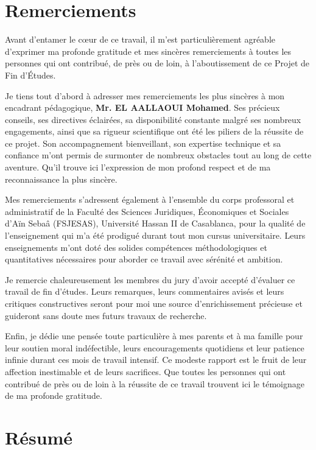 \chapter*{Remerciements}

Avant d'entamer le cœur de ce travail, il m'est particulièrement agréable d'exprimer ma profonde gratitude et mes sincères remerciements à toutes les personnes qui ont contribué, de près ou de loin, à l'aboutissement de ce Projet de Fin d'Études.

Je tiens tout d'abord à adresser mes remerciements les plus sincères à mon encadrant pédagogique, \textbf{Mr. EL AALLAOUI Mohamed}. Ses précieux conseils, ses directives éclairées, sa disponibilité constante malgré ses nombreux engagements, ainsi que sa rigueur scientifique ont été les piliers de la réussite de ce projet. Son accompagnement bienveillant, son expertise technique et sa confiance m'ont permis de surmonter de nombreux obstacles tout au long de cette aventure. Qu'il trouve ici l'expression de mon profond respect et de ma reconnaissance la plus sincère.

Mes remerciements s'adressent également à l'ensemble du corps professoral et administratif de la Faculté des Sciences Juridiques, Économiques et Sociales d'Aïn Sebaâ (FSJESAS), Université Hassan II de Casablanca, pour la qualité de l'enseignement qui m'a été prodigué durant tout mon cursus universitaire. Leurs enseignements m'ont doté des solides compétences méthodologiques et quantitatives nécessaires pour aborder ce travail avec sérénité et ambition.

Je remercie chaleureusement les membres du jury d'avoir accepté d'évaluer ce travail de fin d'études. Leurs remarques, leurs commentaires avisés et leurs critiques constructives seront pour moi une source d'enrichissement précieuse et guideront sans doute mes futurs travaux de recherche.

Enfin, je dédie une pensée toute particulière à mes parents et à ma famille pour leur soutien moral indéfectible, leurs encouragements quotidiens et leur patience infinie durant ces mois de travail intensif. Ce modeste rapport est le fruit de leur affection inestimable et de leurs sacrifices. Que toutes les personnes qui ont contribué de près ou de loin à la réussite de ce travail trouvent ici le témoignage de ma profonde gratitude.

\newpage

\chapter*{Résumé}

